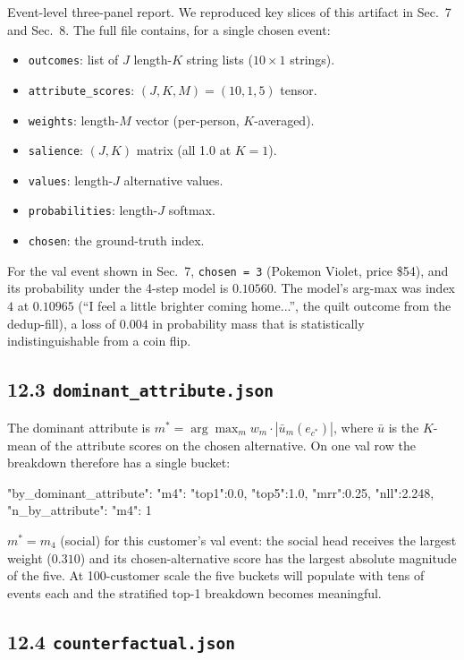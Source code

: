 \documentclass[11pt,a4paper]{article}
\begin{document}
Event-level three-panel report. We reproduced key slices of this
artifact in Sec.~7 and Sec.~8. The full file contains, for a single
chosen event:
\begin{itemize}
\item \texttt{outcomes}: list of $J$ length-$K$ string lists
($10 \times 1$ strings).
\item \texttt{attribute\_scores}: $(J, K, M) = (10, 1, 5)$ tensor.
\item \texttt{weights}: length-$M$ vector (per-person, $K$-averaged).
\item \texttt{salience}: $(J, K)$ matrix (all 1.0 at $K = 1$).
\item \texttt{values}: length-$J$ alternative values.
\item \texttt{probabilities}: length-$J$ softmax.
\item \texttt{chosen}: the ground-truth index.
\end{itemize}

For the val event shown in Sec.~7, \texttt{chosen = 3} (Pokemon
Violet, price \$54), and its probability under the 4-step model is
$0.10560$. The model's arg-max was index $4$ at $0.10965$
(``I feel a little brighter coming home...'', the quilt outcome from
the dedup-fill), a loss of $0.004$ in probability mass that is
statistically indistinguishable from a coin flip.

\subsection*{12.3 \texttt{dominant\_attribute.json}}

The dominant attribute is
$m^* = \arg\max_m w_m \cdot |\bar{u}_m(e_{c^*})|$, where $\bar{u}$ is
the $K$-mean of the attribute scores on the chosen alternative. On
one val row the breakdown therefore has a single bucket:

\begin{code}
{
 "by_dominant_attribute":
     {"m4": {"top1":0.0, "top5":1.0, "mrr":0.25, "nll":2.248}},
 "n_by_attribute": {"m4": 1}
}
\end{code}

$m^* = m_4$ (social) for this customer's val event: the social head
receives the largest weight ($0.310$) and its chosen-alternative score
has the largest absolute magnitude of the five. At 100-customer scale
the five buckets will populate with tens of events each and the
stratified top-1 breakdown becomes meaningful.

\subsection*{12.4 \texttt{counterfactual.json}}
\end{document}
